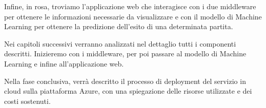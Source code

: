 Infine, in rosa, troviamo l'applicazione web che interagisce con i due middleware per ottenere le informazioni necessarie da visualizzare e con il modello di Machine Learning per ottenere la predizione dell'esito di una determinata partita.

\vspace{+20px}

Nei capitoli successivi verranno analizzati nel dettaglio tutti i componenti descritti. Inizieremo con i middleware, per poi passare al modello di Machine Learning e infine all'applicazione web.

Nella fase conclusiva, verrà descritto il processo di deployment del servizio in cloud sulla piattaforma Azure, con una spiegazione delle risorse utilizzate e dei costi sostenuti.
